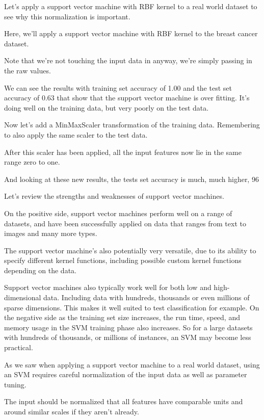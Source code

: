 \begin{multicols}{2}
Let's apply a support vector machine with RBF kernel to a real world dataset to see why this normalization is important. 

Here, we'll apply a support vector machine with RBF kernel to the breast cancer dataset. 

Note that we're not touching the input data in anyway, we're simply passing in the raw values. 

We can see the results with training set accuracy of 1.00 and the test set accuracy of 0.63 that show that the support vector machine is over fitting. It's doing well on the training data, but very poorly on the test data. 

Now let's add a MinMaxScaler transformation of the training data. Remembering to also apply the same scaler to the test data. 

After this scaler has been applied, all the input features now lie in the same range zero to one. 

And looking at these new results, the tests set accuracy is much, much higher, 96%

Let's review the strengths and weaknesses of support vector machines. 

On the positive side, support vector machines perform well on a range of datasets, and have been successfully applied on data that ranges from text to images and many more types. 

The support vector machine's also potentially very versatile, due to its ability to specify different kernel functions, including possible custom kernel functions depending on the data. 

Support vector machines also typically work well for both low and high-dimensional data. Including data with hundreds, thousands or even millions of sparse dimensions. This makes it well suited to test classification for example. On the negative side as the training set size increases, the run time, speed, and memory usage in the SVM training phase also increases. So for a large datasets with hundreds of thousands, or millions of instances, an SVM may become less practical. 

As we saw when applying a support vector machine to a real world dataset, using an SVM requires careful normalization of the input data as well as parameter tuning. 

The input should be normalized that all features have comparable units and around similar scales if they aren't already. 


\end{multicols}
